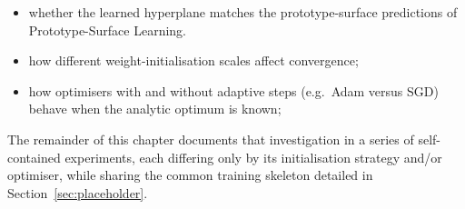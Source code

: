\begin{itemize}

\item whether the learned hyperplane matches the prototype-surface predictions of Prototype-Surface Learning.

\item how different weight-initialisation scales affect convergence;

\item how optimisers with and without adaptive steps (e.g.\ Adam versus SGD) behave when the analytic optimum is known;

\end{itemize}

The remainder of this chapter documents that investigation in a series of self-contained experiments, each differing only by its initialisation strategy and/or optimiser, while sharing the common training skeleton detailed in Section~\ref{sec:placeholder}.
